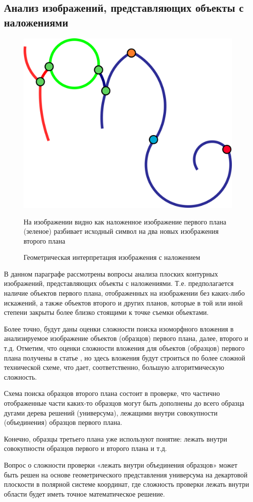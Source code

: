 \subsection{Анализ изображений, представляющих объекты с наложениями}

\begin{figure}[h]
\centering
\includegraphics[width=0.55\linewidth,keepaspectratio]{images/overlaps}
\caption{Геометрическая интерпретация изображения с наложением}
\medskip
\small
На изображении видно как наложенное изображение первого плана (зеленое) разбивает исходный символ на два новых изображения второго плана
\end{figure}

В данном параграфе рассмотрены вопросы анализа плоских контурных изображений, представляющих объекты с наложениями. Т.е. предполагается наличие объектов первого плана, отображенных на изображении без каких-либо искажений,  а также объектов второго и других планов, которые в той или иной степени закрыты более близко стоящими к точке съемки объектами.

Более точно, будут даны оценки сложности поиска изоморфного вложения в анализируемое изображение объектов (образцов) первого плана, далее, второго и т.д. Отметим, что оценки сложности вложения для объектов (образцов) первого плана получены в статье  \cite{D8}, но здесь вложения будут строиться по более сложной технической схеме, что дает, соответственно,  большую алгоритмическую сложность.

Схема поиска образцов второго плана состоит в проверке, что частично отображенные части каких-то образцов могут быть дополнены до всего образца дугами дерева решений (универсума), лежащими внутри  совокупности (объединения) образцов первого плана.

Конечно,  образцы третьего плана уже используют понятие: лежать внутри  совокупности образцов первого и второго плана и т.д.

Вопрос о сложности проверки «лежать внутри объединения образцов» может быть решен на основе геометрического представления универсума на декартовой плоскости в полярной системе координат, где сложность проверки лежать внутри области будет иметь точное математическое решение.

